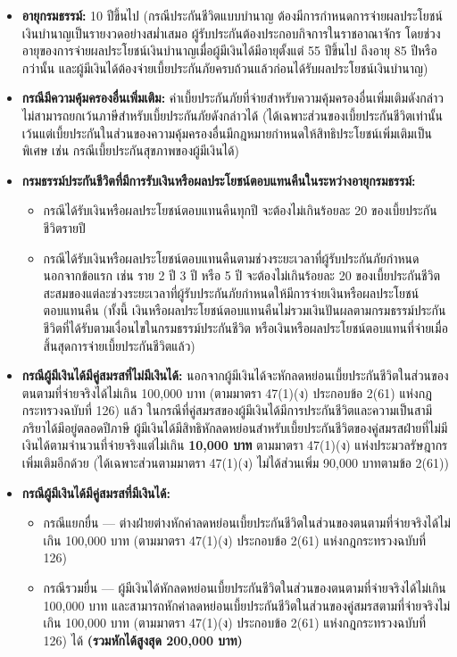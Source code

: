 \documentclass[12pt,a4paper]{article}
\newcommand{\hilight}[1]{\textbf{#1}}
\begin{document}
\begin{itemize}
    \item \textbf{อายุกรมธรรม์:} 10 ปีขึ้นไป (กรณีประกันชีวิตแบบบำนาญ ต้องมีการกำหนดการจ่ายผลประโยชน์เงินบำนาญเป็นรายงวดอย่างสม่ำเสมอ ผู้รับประกันต้องประกอบกิจการในราชอาณาจักร โดยช่วงอายุของการจ่ายผลประโยชน์เงินบำนาญเมื่อผู้มีเงินได้มีอายุตั้งแต่ 55 ปีขึ้นไป ถึงอายุ 85 ปีหรือกว่านั้น และผู้มีเงินได้ต้องจ่ายเบี้ยประกันภัยครบถ้วนแล้วก่อนได้รับผลประโยชน์เงินบำนาญ)
    \item \textbf{กรณีมีความคุ้มครองอื่นเพิ่มเติม:} ค่าเบี้ยประกันภัยที่จ่ายสำหรับความคุ้มครองอื่นเพิ่มเติมดังกล่าว ไม่สามารถยกเว้นภาษีสำหรับเบี้ยประกันภัยดังกล่าวได้ (ได้เฉพาะส่วนของเบี้ยประกันชีวิตเท่านั้น เว้นแต่เบี้ยประกันในส่วนของความคุ้มครองอื่นมีกฎหมายกำหนดให้สิทธิประโยชน์เพิ่มเติมเป็นพิเศษ เช่น กรณีเบี้ยประกันสุขภาพของผู้มีเงินได้)
    \item \textbf{กรมธรรม์ประกันชีวิตที่มีการรับเงินหรือผลประโยชน์ตอบแทนคืนในระหว่างอายุกรมธรรม์:}
    \begin{itemize}
        \item กรณีได้รับเงินหรือผลประโยชน์ตอบแทนคืนทุกปี จะต้องไม่เกินร้อยละ 20 ของเบี้ยประกันชีวิตรายปี
        \item กรณีได้รับเงินหรือผลประโยชน์ตอบแทนคืนตามช่วงระยะเวลาที่ผู้รับประกันภัยกำหนดนอกจากข้อแรก เช่น ราย 2 ปี 3 ปี หรือ 5 ปี จะต้องไม่เกินร้อยละ 20 ของเบี้ยประกันชีวิตสะสมของแต่ละช่วงระยะเวลาที่ผู้รับประกันภัยกำหนดให้มีการจ่ายเงินหรือผลประโยชน์ตอบแทนคืน (ทั้งนี้ เงินหรือผลประโยชน์ตอบแทนคืนไม่รวมเงินปันผลตามกรมธรรม์ประกันชีวิตที่ได้รับตามเงื่อนไขในกรมธรรม์ประกันชีวิต หรือเงินหรือผลประโยชน์ตอบแทนที่จ่ายเมื่อสิ้นสุดการจ่ายเบี้ยประกันชีวิตแล้ว)
    \end{itemize}
    \item \textbf{กรณีผู้มีเงินได้มีคู่สมรสที่ไม่มีเงินได้:} นอกจากผู้มีเงินได้จะหักลดหย่อนเบี้ยประกันชีวิตในส่วนของตนตามที่จ่ายจริงได้ไม่เกิน 100,000 บาท (ตามมาตรา 47(1)(ง) ประกอบข้อ 2(61) แห่งกฎกระทรวงฉบับที่ 126) แล้ว ในกรณีที่คู่สมรสของผู้มีเงินได้มีการประกันชีวิตและความเป็นสามีภริยาได้มีอยู่ตลอดปีภาษี ผู้มีเงินได้มีสิทธิหักลดหย่อนสำหรับเบี้ยประกันชีวิตของคู่สมรสฝ่ายที่ไม่มีเงินได้ตามจำนวนที่จ่ายจริงแต่ไม่เกิน \hilight{10,000 บาท} ตามมาตรา 47(1)(ง) แห่งประมวลรัษฎากรเพิ่มเติมอีกด้วย (ได้เฉพาะส่วนตามมาตรา 47(1)(ง) ไม่ได้ส่วนเพิ่ม 90,000 บาทตามข้อ 2(61))
    \item \textbf{กรณีผู้มีเงินได้มีคู่สมรสที่มีเงินได้:}
    \begin{itemize}
        \item กรณีแยกยื่น --- ต่างฝ่ายต่างหักค่าลดหย่อนเบี้ยประกันชีวิตในส่วนของตนตามที่จ่ายจริงได้ไม่เกิน 100,000 บาท (ตามมาตรา 47(1)(ง) ประกอบข้อ 2(61) แห่งกฎกระทรวงฉบับที่ 126)
        \item กรณีรวมยื่น --- ผู้มีเงินได้หักลดหย่อนเบี้ยประกันชีวิตในส่วนของตนตามที่จ่ายจริงได้ไม่เกิน 100,000 บาท และสามารถหักค่าลดหย่อนเบี้ยประกันชีวิตในส่วนของคู่สมรสตามที่จ่ายจริงไม่เกิน 100,000 บาท (ตามมาตรา 47(1)(ง) ประกอบข้อ 2(61) แห่งกฎกระทรวงฉบับที่ 126) ได้ \hilight{(รวมหักได้สูงสุด 200,000 บาท)}
    \end{itemize}
\end{itemize}
\end{document}
